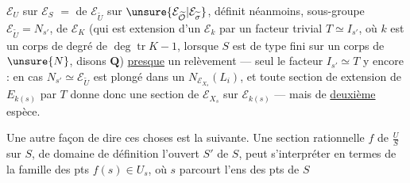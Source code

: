 $\mathcal E_U$ sur $\mathcal E_S$  $=$ de $\mathcal E_{\widetilde U}$ sur $\unsure{\mathcal E_{\widetilde{\mathcal O}}|\mathcal E_{\widetilde\sigma}}$, définit néanmoins,   sous-groupe $\mathcal E_{\widetilde U}=N_{s'}$, de $\mathcal E_K$ (qui est extension d'un $\mathcal E_k$ par un facteur trivial  $T\simeq I_{s'}$, où $k$ est un corps de degré de  $\deg\operatorname{tr}K-1$, lorsque $S$ est de type fini sur un corps de $\unsure{N}$, disons $\mathbf Q$) \uline{presque} un relèvement --- seul le facteur $I_{s'}\simeq T$ y  encore : en  cas $N_{s'}\simeq\mathcal E_{\widetilde U}$ est plongé dans un $N_{\mathcal E_{X_s}}(L_i)$, et toute section de  extension de $E_{k(s)}$ par $T$ donne donc une section de $\mathcal E_{X_s}$ sur $\mathcal E_{k(s)}$ --- mais de \uline{deuxième} espèce.

Une autre façon de dire ces choses est la suivante. Une section rationnelle $f$ de $\frac{U}{S}$ sur $S$, de domaine de définition l'ouvert $S'$ de $S$,  peut s'interpréter en termes de la famille des pts $f(s)\in U_s$, où $s$ parcourt l'ens des pts de $S$
